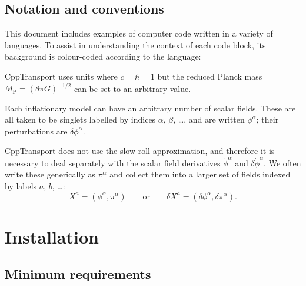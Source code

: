 \documentclass[11pt,a4paper]{article}
\newcommand{\Mp}{M_{\mathrm{P}}}
\newcommand{\packagefont}{\sffamily}
\newcommand{\CppTransport}{{\packagefont CppTransport}}
\newcommand{\CMake}{{\packagefont CMake}}
\newcommand\CC{C\nolinebreak\hspace{-.05em}\raisebox{.4ex}{\relsize{-3}{\textbf{+}}}\nolinebreak\hspace{-.10em}\raisebox{.4ex}{\relsize{-3}{\textbf{+}}}}
\begin{document}
\subsection{Notation and conventions}
This document includes examples of computer code written in a variety
of languages.
To assist in understanding the context of each code block, its background
is colour-coded according to the language:
{\CppTransport} uses units where $c=\hbar=1$ but the
reduced Planck mass $\Mp = (8\pi G)^{-1/2}$
can be set to an arbitrary value.

Each inflationary model can have an arbitrary number of scalar fields. These are
all taken to be singlets
labelled by indices $\alpha$, $\beta$, \dots,
and are written $\phi^\alpha$; their perturbations are $\delta\phi^\alpha$.

{\CppTransport} does not use the slow-roll approximation, and therefore it is necessary
to deal separately with the scalar field derivatives
$\dot{\phi}^\alpha$ and $\delta\dot{\phi}^\alpha$.
We often write these generically as $\pi^\alpha$ and collect them
into a larger
set of fields indexed by labels $a$, $b$, \ldots:
\begin{equation}
    X^a = (\phi^\alpha, \pi^\alpha)
    \qquad
    \text{or}
    \qquad
    \delta X^a = (\delta\phi^\alpha, \delta\pi^\alpha) .    
\end{equation}

\section{Installation}

\subsection{Minimum requirements}
\end{document}
